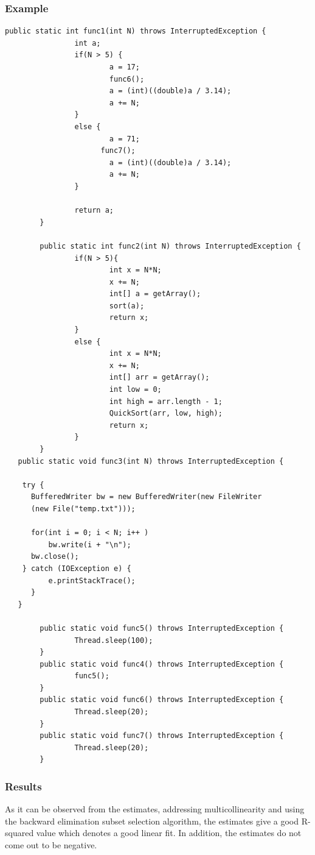 \documentclass[11pt]{article}
\begin{document}
\subsubsection{Example}
\begin{lstlisting}
public static int func1(int N) throws InterruptedException {
                int a;
                if(N > 5) {
                        a = 17;
                        func6();
                        a = (int)((double)a / 3.14);
                        a += N;
                }
                else {
                        a = 71;
                      func7();
                        a = (int)((double)a / 3.14);
                        a += N;
                }

                return a;
        }

        public static int func2(int N) throws InterruptedException {
                if(N > 5){
                        int x = N*N;
                        x += N;
                        int[] a = getArray();
                        sort(a);
                        return x;
                }
                else {
                        int x = N*N;
                        x += N;
                        int[] arr = getArray();
                        int low = 0;
                        int high = arr.length - 1;
                        QuickSort(arr, low, high);
                        return x;
                }
        }
   public static void func3(int N) throws InterruptedException {

    try {
      BufferedWriter bw = new BufferedWriter(new FileWriter
      (new File("temp.txt")));

      for(int i = 0; i < N; i++ )
          bw.write(i + "\n");
      bw.close();
    } catch (IOException e) {
          e.printStackTrace();
      }
   }

        public static void func5() throws InterruptedException {
                Thread.sleep(100);
        }
        public static void func4() throws InterruptedException {
                func5();
        }
        public static void func6() throws InterruptedException {
                Thread.sleep(20);
        }
        public static void func7() throws InterruptedException {
                Thread.sleep(20);
        }
\end{lstlisting}
\newpage
\subsubsection{Results}
As it can be observed from the estimates, addressing multicollinearity and using the backward elimination subset selection algorithm, the estimates give a good R-squared value which denotes a good linear fit. In addition, the estimates do not come out to be negative.\\
\end{document}

